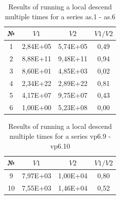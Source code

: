 \documentclass{ifacconf}
\begin{document}
\begin{table}[ht]
	\centering
	\begin{tabular}{|c|c|c|c|}
		\hline
		\hspace*{0.1cm}№\hspace*{0.1cm} &
		\hspace*{0.1cm}$V1$\hspace*{0.1cm}&
		\hspace*{0.1cm}$V2$\hspace*{0.1cm}&
		\hspace*{0.1cm}$V1/V2$\hspace*{0.1cm}\\
		\hline
		1 &  2,84E+05  &  5,74E+05 &   0,49\\
		2 &  8,88E+11  &  9,48E+11 &   0,94\\
		3 &  8,60E+01  &  4,85E+03 &   0,02\\
		4 &  2,34E+22  &  2,89E+22 &   0,81\\
		5 &  4,17E+07  &  9,75E+07 &   0,43\\
		6 &  1,00E+00  &  5,23E+08 &   0,00\\
		\hline
	\end{tabular}
	\caption{Results of running a local descend multiple times for a series as.1 - as.6}	\label{spher_as}
\end{table}
\begin{table}[ht]
	\centering
	\begin{tabular}{|c|c|c|c|}
		\hline
		\hspace*{0.1cm}№\hspace*{0.1cm} &
		\hspace*{0.1cm}$V1$\hspace*{0.1cm}&
		\hspace*{0.1cm}$V2$\hspace*{0.1cm}&
		\hspace*{0.1cm}$V1/V2$\hspace*{0.1cm}\\
		\hline
		9  & 7,97E+03  &  1,00E+04  &  0,80\\
		10 & 7,55E+03  &  1,46E+04  &  0,52\\
		\hline
	\end{tabular}
	\caption{Results of running a local descend multiple times for a series vp6.9 - vp6.10}	\label{spher_vp6}
\end{table}
\end{document}
